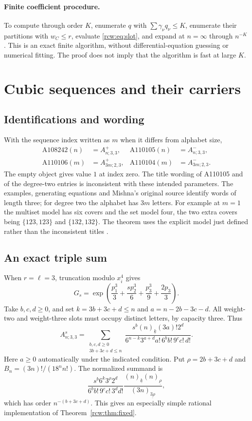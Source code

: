 \documentclass[11pt]{article}
\theoremstyle{definition}\newtheorem{definition}[theorem]{Definition}
\theoremstyle{remark}\newtheorem{remark}[theorem]{Remark}
\newcommand{\fall}[2]{(#1)_{\underline{#2}}}
\numberwithin{equation}{section}
\begin{document}
\paragraph{Finite coefficient procedure.}
To compute through order $K$, enumerate $q$ with $\sum\gamma_\nu q_\nu\le K$, enumerate their partitions with $w_C\le r$, evaluate \eqref{rcw:eq:slot}, and expand at $n=\infty$ through $n^{-K}$. This is an exact finite algorithm, without differential-equation guessing or numerical fitting. The proof does not imply that the algorithm is fast at large $K$.

\section{Cubic sequences and their carriers}\label{rcw:sec:oeis}
\subsection{Identifications and wording}
With the sequence index written as $m$ when it differs from alphabet size,
\begin{align*}
 \mathrm{A108242}(n)&=A^+_{n;3,3}, &
 \mathrm{A110105}(n)&=A^-_{n;3,3},\\
 \mathrm{A110106}(m)&=A^+_{3m;2,3}, &
 \mathrm{A110104}(m)&=A^-_{3m;2,3}.
\end{align*}
The empty object gives value $1$ at index zero. The title wording of A110105 and of the degree-two entries is inconsistent with these intended parameters. The examples, generating equations and Mishna's original source identify words of length three; for degree two the alphabet has $3m$ letters. For example at $m=1$ the multiset model has six covers and the set model four, the two extra covers being $\{123,123\}$ and $\{132,132\}$. The theorem uses the explicit model just defined rather than the inconsistent titles \cite{oeis110105,oeis110104,oeis110106,mishna}.

\subsection{An exact triple sum}
When $r=\ell=3$, truncation modulo $x_i^4$ gives
\[
 G_s=\exp\left(\frac{p_1^3}3+\frac{s p_2^3}6
                     +\frac{p_3^3}9+\frac{2p_3}3\right).
\]
Take $b,c,d\ge0$, and set $k=3b+3c+d\le n$ and $a=n-2b-3c-d$. All weight-two and weight-three slots must occupy distinct letters, by capacity three. Thus
\begin{equation}\label{rcw:eq:triplesum}
 A^s_{n;3,3}=\sum_{\substack{b,c,d\ge0\\3b+3c+d\le n}}
 \frac{s^b\fall nk(3a)!2^d}
 {6^{n-k}3^{a+d}a!\,6^b b!\,9^c c!\,d!}.
\end{equation}
Here $a\ge0$ automatically under the indicated condition. Put $\rho=2b+3c+d$ and $B_n=(3n)!/(18^n n!)$. The normalized summand is
\begin{equation}\label{rcw:eq:normalizedtriple}
 \frac{s^b6^k3^\rho2^d}{6^b b!\,9^c c!\,3^d d!}
 \frac{\fall nk\fall n\rho}{\fall{3n}{3\rho}},
\end{equation}
which has order $n^{-(b+3c+d)}$. This gives an especially simple rational implementation of Theorem~\ref{rcw:thm:fixed}.
\end{document}
